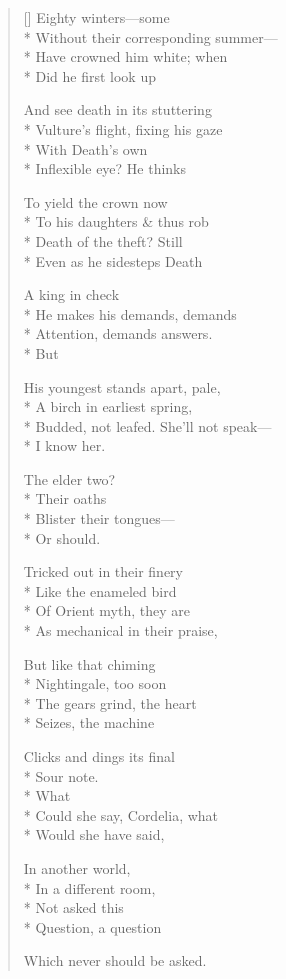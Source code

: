\label{ch:lear_ag}
\begin{verse}[\versewidth]
Eighty winters---some\\*
Without their corresponding summer---\\*
Have crowned him white; when\\*
Did he first look up

And see death in its stuttering\\*
Vulture's flight, fixing his gaze\\*
With Death's own\\*
Inflexible eye?\hspace*{3\vgap} He thinks

To yield the crown now\\*
To his daughters \& thus rob\\*
Death of the theft?   Still\\*
Even as he sidesteps Death

A king in check\\*
He makes his demands, demands\\*
Attention, demands answers.\\*
\hspace*{3\vgap} But

His youngest stands apart, pale,\\*
A birch in earliest spring,\\*
Budded, not leafed. She'll not speak---\\*
I know her.

\hspace*{3\vgap} The elder two?\\*
Their oaths\\*
Blister their tongues---\\*
Or should.

Tricked out in their finery\\*
Like the enameled bird\\*
Of Orient myth, they are\\*
As mechanical in their praise,

But like that chiming\\*
Nightingale, too soon\\*
The gears grind, the heart\\*
Seizes, the machine

Clicks and dings its final\\*
Sour note.\\*
\hspace*{3\vgap} What\\*
Could she say, Cordelia, what\\*
Would she have said,

In another world,\\*
In a different room,\\*
Not asked this\\*
Question, a question

Which never should be asked.
\end{verse}
